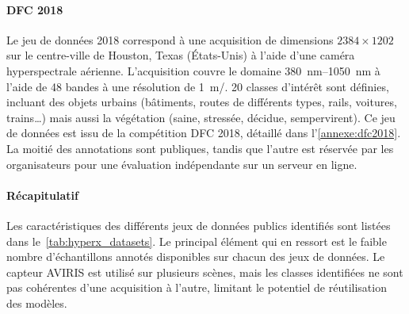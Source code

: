 
\paragraph{DFC 2018}
Le jeu de données  2018 correspond à une acquisition de dimensions $2384\times1202$ sur le centre-ville de Houston, Texas (États-Unis) à l'aide d'une caméra hyperspectrale aérienne. L'acquisition couvre le domaine \SIrange{380}{1050}{\nano\meter} à l'aide de 48 bandes à une résolution de \SI{1}{\meter/\px}. 20 classes d'intérêt sont définies, incluant des objets urbains (bâtiments, routes de différents types, rails, voitures, trains\dots) mais aussi la végétation (saine, stressée, décidue, sempervirent). Ce jeu de données est issu de la compétition \glsdesc{DFC} 2018, détaillé dans l'\cref{annexe:dfc2018}. La moitié des annotations sont publiques, tandis que l'autre est réservée par les organisateurs pour une évaluation indépendante sur un serveur en ligne.

\paragraph{Récapitulatif}

Les caractéristiques des différents jeux de données publics identifiés sont listées dans le~\cref{tab:hyperx_datasets}. Le principal élément qui en ressort est le faible nombre d'échantillons annotés disponibles sur chacun des jeux de données. Le capteur \gls{AVIRIS} est utilisé sur plusieurs scènes, mais les classes identifiées ne sont pas cohérentes d'une acquisition à l'autre, limitant le potentiel de réutilisation des modèles.

